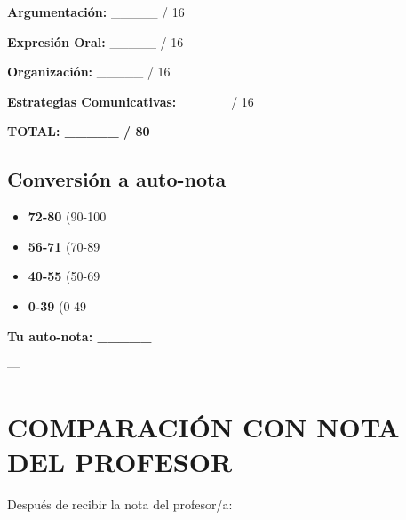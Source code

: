 \documentclass[a4paper,11pt]{article}
\begin{document}
\textbf{Argumentación:} _____ / 16

\textbf{Expresión Oral:} _____ / 16

\textbf{Organización:} _____ / 16

\textbf{Estrategias Comunicativas:} _____ / 16

\vspace{0.2cm}

\textbf{TOTAL: _____ / 80}

\vspace{0.2cm}

\subsection{Conversión a auto-nota}

\vspace{0.2cm}

\begin{itemize}

  \item \textbf{72-80} (90-100%

  \item \textbf{56-71} (70-89%

  \item \textbf{40-55} (50-69%

  \item \textbf{0-39} (0-49%

\end{itemize}

\vspace{0.2cm}

\textbf{Tu auto-nota: _____}

\vspace{0.2cm}

---

\vspace{0.2cm}

\section{COMPARACIÓN CON NOTA DEL PROFESOR}

\vspace{0.2cm}

Después de recibir la nota del profesor/a:

\vspace{0.2cm}
\end{document}
